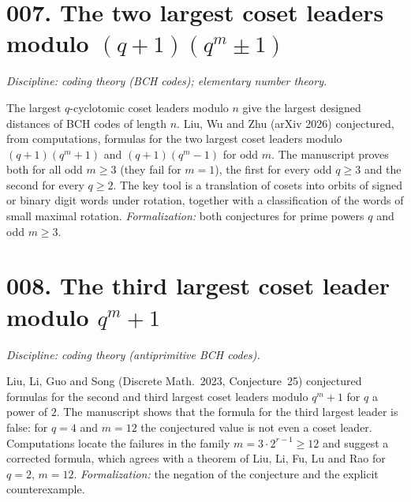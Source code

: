 \documentclass[11pt]{amsart}
\begin{document}
\section*{007. The two largest coset leaders modulo $(q+1)(q^m\pm1)$}
\emph{Discipline: coding theory (BCH codes); elementary number theory.}

The largest $q$-cyclotomic coset leaders modulo $n$ give the largest designed distances of BCH codes of length $n$.
Liu, Wu and Zhu (arXiv 2026) conjectured, from computations, formulas for the two largest coset leaders modulo $(q+1)(q^m+1)$ and $(q+1)(q^m-1)$ for odd $m$.
The manuscript proves both for all odd $m\ge3$ (they fail for $m=1$), the first for every odd $q\ge3$ and the second for every $q\ge2$.
The key tool is a translation of cosets into orbits of signed or binary digit words under rotation, together with a classification of the words of small maximal rotation.
\emph{Formalization:} both conjectures for prime powers $q$ and odd $m\ge3$.

\section*{008. The third largest coset leader modulo $q^m+1$}
\emph{Discipline: coding theory (antiprimitive BCH codes).}

Liu, Li, Guo and Song (Discrete Math.\ 2023, Conjecture~25) conjectured formulas for the second and third largest coset leaders modulo $q^m+1$ for $q$ a power of $2$.
The manuscript shows that the formula for the third largest leader is false: for $q=4$ and $m=12$ the conjectured value is not even a coset leader.
Computations locate the failures in the family $m=3\cdot2^{r-1}\ge12$ and suggest a corrected formula, which agrees with a theorem of Liu, Li, Fu, Lu and Rao for $q=2$, $m=12$.
\emph{Formalization:} the negation of the conjecture and the explicit counterexample.
\end{document}
